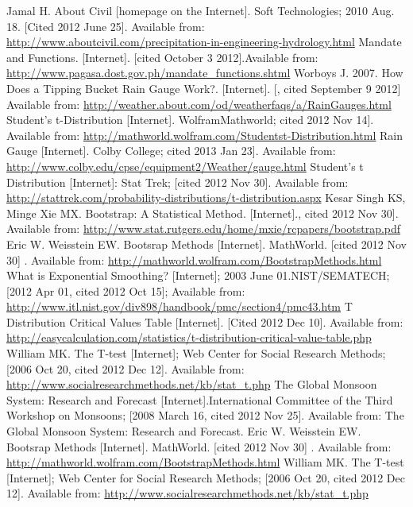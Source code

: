 \documentclass{pshscarc}\usepackage{graphicx, color}
\begin{document}
\begin{thebibliography}{99\kern\bibindent}
 Jamal H. About Civil [homepage on the Internet]. Soft Technologies; 2010 Aug. 18. [Cited 2012 June 25]. Available from: \url{http://www.aboutcivil.com/precipitation-in-engineering-hydrology.html}
 Mandate and Functions. [Internet]. [cited October 3 2012].Available from:  \url{http://www.pagasa.dost.gov.ph/mandate_functions.shtml}
 Worboys J. 2007. How Does a Tipping Bucket Rain Gauge Work?. [Internet]. [, cited September 9 2012] Available from: \url{ http://weather.about.com/od/weatherfaqs/a/RainGauges.html}
 Student's t-Distribution [Internet]. WolframMathworld; cited 2012 Nov 14]. Available from: \url{http://mathworld.wolfram.com/Studentst-Distribution.html}
 Rain Gauge [Internet]. Colby College; cited 2013 Jan 23]. Available from: \url{ http://www.colby.edu/cpse/equipment2/Weather/gauge.html}
 Student's t Distribution [Internet]: Stat Trek; [cited 2012 Nov 30]. Available from: \url{ http://stattrek.com/probability-distributions/t-distribution.aspx}
 Kesar Singh KS, Minge Xie MX.  Bootstrap: A Statistical Method. [Internet]., cited 2012 Nov 30]. Available from: \url{ http://www.stat.rutgers.edu/home/mxie/rcpapers/bootstrap.pdf}
\bibitem Eric W. Weisstein EW. Bootsrap Methods [Internet]. MathWorld. [cited 2012 Nov 30] . Available from: \url{http://mathworld.wolfram.com/BootstrapMethods.html}
 What is Exponential Smoothing? [Internet]; 2003 June 01.NIST/SEMATECH; [2012 Apr 01, cited 2012 Oct 15]; Available from: \url{ http://www.itl.nist.gov/div898/handbook/pmc/section4/pmc43.htm}
 T Distribution Critical Values Table [Internet]. [Cited 2012 Dec 10]. Available from: \url{http://easycalculation.com/statistics/t-distribution-critical-value-table.php}
 William MK. The T-test [Internet]; Web Center for Social Research Methods; [2006 Oct 20, cited 2012 Dec 12]. Available from: \url{ http://www.socialresearchmethods.net/kb/stat_t.php}
 The Global Monsoon System: Research and Forecast [Internet].International Committee of the Third Workshop on Monsoons; [2008 March 16, cited 2012 Nov 25]. Available from: The Global Monsoon System: Research and Forecast.	
 Eric W. Weisstein EW. Bootsrap Methods [Internet]. MathWorld. [cited 2012 Nov 30] . Available from:  \url{http://mathworld.wolfram.com/BootstrapMethods.html}
 William MK. The T-test [Internet]; Web Center for Social Research Methods; [2006 Oct 20, cited 2012 Dec 12]. Available from: \url{http://www.socialresearchmethods.net/kb/stat_t.php}


\end{thebibliography}
\end{document}
